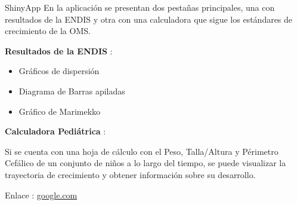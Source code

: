 \documentclass[
  9pt,
  ignorenonframetext,
]{beamer}
\begin{document}
\begin{frame}{ShinyApp}
\protect\hypertarget{shinyapp}{}
En la aplicación se presentan dos pestañas principales, una con
resultados de la ENDIS y otra con una calculadora que sigue los
estándares de crecimiento de la OMS.

\textbf{Resultados de la ENDIS} :

\begin{itemize}
    \pause
  
    \item{Gráficos de dispersión}
    
    \pause
    
    \item{Diagrama de Barras apiladas}
    
    \pause
    
    \item{Gráfico de Marimekko}
    
  \end{itemize}

\pause

\textbf{Calculadora Pediátrica} :

\pause

Si se cuenta con una hoja de cálculo con el Peso, Talla/Altura y
Périmetro Cefálico de un conjunto de niños a lo largo del tiempo, se
puede visualizar la trayectoria de crecimiento y obtener información
sobre su desarrollo.

Enlace : \url{google.com}
\end{frame}
\end{document}

